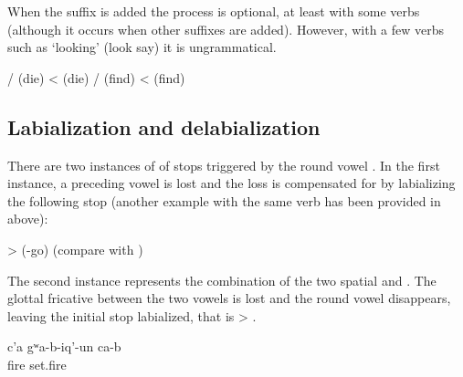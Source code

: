 When the  suffix is added the process is optional, at least with some verbs  (although it occurs when other suffixes are added). However, with a few verbs such as  `looking' (look say) it is ungrammatical.
%
\begin{exe}
	\ex	\label{ex:masdar palatalization phon}
	\begin{xlist}
		\ex	{}\slash{} (die) <  (die) 
		\ex	{}\slash{} (find) <  (find)
	\end{xlist}
\end{exe}



\subsection{Labialization and delabialization}
\label{ssec:Labialization and delabialization}

There are two instances of  of stops triggered by the round vowel . In the first instance, a preceding vowel is lost and the loss is compensated for by labializing the following stop (another example with the same verb has been provided in  above):
%
\begin{exe} \label{ex:insidephon2}
	\ex	{} >  \newline\hspace*{2em}(-go) (compare with )
\end{exe}

The second instance represents the combination of the two spatial    and  . The glottal fricative between the two vowels is lost and the round vowel disappears, leaving the initial stop labialized, that is  >  .
%
\begin{exe}
	\ex	\label{ex:She set up a phon}
	\gll	c'a	gʷa-b-iq'-un	ca-b\\
		fire	set.fire	 \\
	\glt	{}
\end{exe}

